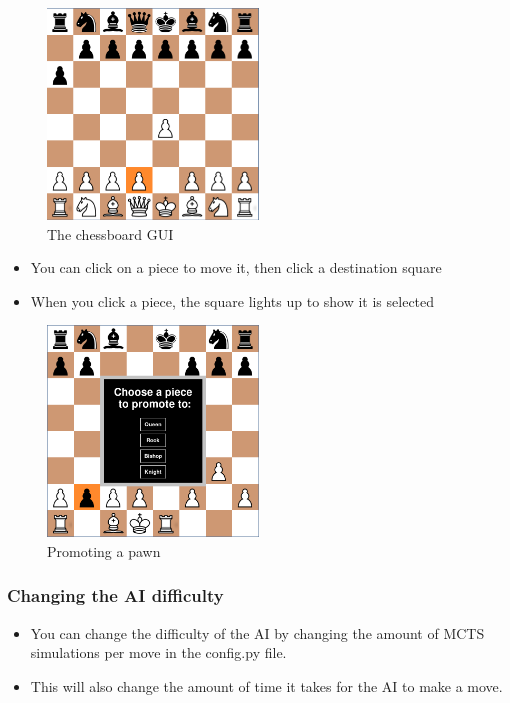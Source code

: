 \documentclass{article}
\begin{document}
\begin{figure}[H]
    \centering
    \includegraphics[width=0.5\textwidth]{img/chessboard-gui.png}
    \caption{The chessboard GUI}
\end{figure}

\begin{itemize}
    \item You can click on a piece to move it, then click a destination square
    \item When you click a piece, the square lights up to show it is selected 
\end{itemize}

\begin{figure}[H]
    \centering
    \includegraphics[width=0.5\textwidth]{img/chessboard-promotion.png}
    \caption{Promoting a pawn}
\end{figure}

\subsubsection{Changing the AI difficulty}

\begin{itemize}
    \item You can change the difficulty of the AI by changing the amount of MCTS simulations per move in the config.py file.
    \item This will also change the amount of time it takes for the AI to make a move.
\end{itemize}

\end{document}
